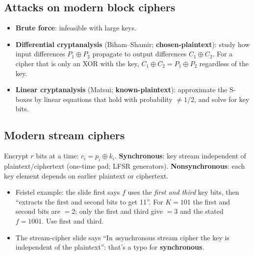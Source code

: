 \subsection{Attacks on modern block ciphers}
\begin{itemize}
  \item \textbf{Brute force}: infeasible with large keys.
  \item \textbf{Differential cryptanalysis} (Biham--Shamir; \textbf{chosen-plaintext}): study how input differences $P_1 \oplus P_2$ propagate to output differences $C_1 \oplus C_2$. For a cipher that is only an XOR with the key, $C_1 \oplus C_2 = P_1 \oplus P_2$ regardless of the key.
  \item \textbf{Linear cryptanalysis} (Matsui; \textbf{known-plaintext}): approximate the S-boxes by linear equations that hold with probability $\neq 1/2$, and solve for key bits.
\end{itemize}

\subsection{Modern stream ciphers}
Encrypt $r$ bits at a time: $c_i = p_i \oplus k_i$. \textbf{Synchronous}: key stream independent of plaintext/ciphertext (one-time pad; LFSR generators). \textbf{Nonsynchronous}: each key element depends on earlier plaintext or ciphertext.

\begin{fixbox}
\begin{itemize}
  \item Feistel example: the slide first says $f$ uses the \emph{first and third} key bits, then ``extracts the first and second bits to get 11''. For $K = 101$ the first and second bits are  $= 2$; only the first and third give  $= 3$ and the stated $f = 1001$. Use first and third.
  \item The stream-cipher slide says ``In \emph{a}synchronous stream cipher the key is independent of the plaintext'': that's a typo for \textbf{synchronous}.
\end{itemize}
\end{fixbox}
